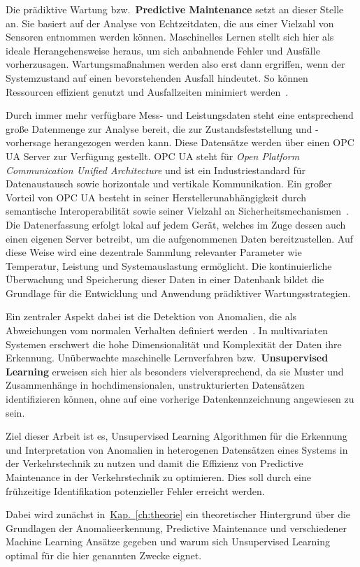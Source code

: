 Die prädiktive Wartung bzw.~\textbf{Predictive Maintenance} setzt an dieser Stelle an. Sie basiert auf der Analyse
von Echtzeitdaten, die aus einer Vielzahl von Sensoren entnommen werden können. Maschinelles Lernen stellt sich hier als ideale
Herangehensweise heraus, um sich anbahnende Fehler und Ausfälle vorherzusagen. Wartungsmaßnahmen werden
also erst dann ergriffen, wenn der Systemzustand auf einen bevorstehenden Ausfall hindeutet. So können Ressourcen effizient
genutzt und Ausfallzeiten minimiert werden~\cite{TobonMejia2012}.

Durch immer mehr verfügbare Mess- und Leistungsdaten steht eine entsprechend große Datenmenge zur Analyse bereit, die zur
Zustandsfeststellung und -vorhersage herangezogen werden kann. Diese Datensätze werden über einen OPC UA Server zur
Verfügung gestellt. OPC UA steht für \textit{Open Platform Communication Unified Architecture} und ist ein Industriestandard
für Datenaustausch sowie horizontale und vertikale Kommunikation. Ein großer Vorteil von OPC UA besteht in seiner
Herstellerunabhängigkeit durch semantische Interoperabilität sowie seiner Vielzahl an Sicherheitsmechanismen~\cite{Babel2024}.
Die Datenerfassung erfolgt lokal auf jedem Gerät, welches im Zuge dessen auch einen eigenen Server betreibt, um die aufgenommenen
Daten bereitzustellen. Auf diese Weise wird eine dezentrale Sammlung relevanter Parameter wie Temperatur,
Leistung und Systemauslastung ermöglicht. Die kontinuierliche Überwachung und Speicherung dieser Daten in einer Datenbank
bildet die Grundlage für die Entwicklung und Anwendung prädiktiver Wartungsstrategien.

Ein zentraler Aspekt dabei ist die Detektion von Anomalien, die als Abweichungen vom normalen Verhalten definiert
werden~\cite{Chandola2009}. In multivariaten Systemen erschwert die hohe Dimensionalität und Komplexität der Daten ihre Erkennung.
Unüberwachte maschinelle Lernverfahren bzw.~\textbf{Unsupervised Learning} erweisen sich hier als besonders vielversprechend,
da sie Muster und Zusammenhänge in hochdimensionalen, unstrukturierten Datensätzen identifizieren können, ohne auf eine vorherige
Datenkennzeichnung angewiesen zu sein.

Ziel dieser Arbeit ist es, Unsupervised Learning Algorithmen für die Erkennung und Interpretation von Anomalien in
heterogenen Datensätzen eines Systems in der Verkehrstechnik zu nutzen und damit die Effizienz von Predictive Maintenance
in der Verkehrstechnik zu optimieren. Dies soll durch eine frühzeitige Identifikation potenzieller Fehler erreicht werden.

Dabei wird zunächst in~\hyperref[ch:theorie]{Kap.~\ref*{ch:theorie}} ein theoretischer Hintergrund über die Grundlagen
der Anomalieerkennung, Predictive Maintenance und verschiedener Machine Learning Ansätze gegeben und warum sich Unsupervised
Learning optimal für die hier genannten Zwecke eignet.
